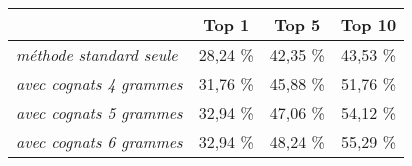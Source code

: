 	\begin{center}
		\begin{tabular}{|l | c c c |}
			\hline
			 & \textbf{Top 1} & \textbf{Top 5} & \textbf{Top 10}\rule[-6pt]{0pt}{18pt} \\
			\hline
			\textit{méthode standard seule} & 28,24 \% & 42,35 \% & 43,53 \% \rule[-4pt]{0pt}{14pt}\\
			\hline
			\textit{avec cognats 4 grammes} & 31,76 \% & 45,88 \% & 51,76 \% \rule[-4pt]{0pt}{14pt}\\
			\hline
			\textit{avec cognats 5 grammes} & 32,94 \% & 47,06 \% & 54,12 \% \rule[-4pt]{0pt}{14pt}\\
			\hline
			\textit{avec cognats 6 grammes} & 32,94 \% & 48,24 \% & 55,29 \% \rule[-4pt]{0pt}{14pt}\\
			\hline
		\end{tabular}
	\end{center}

\vspace{0.5cm}
